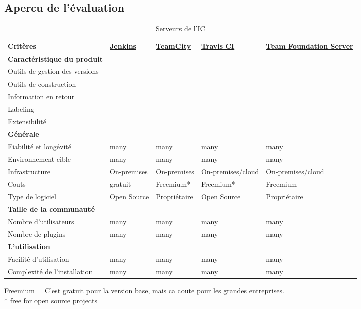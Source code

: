 \begin{landscape}
\subsection{Apercu de l'évaluation}
\begin{table}[H]
	\centering
		\begin{tabular}{lp{4cm}p{4cm}p{4cm}p{4cm}} \toprule
			\textbf{Critères} & \href{https://jenkins-ci.org}{\textbf{Jenkins}} & \href{https://www.jetbrains.com/teamcity/}{\textbf{TeamCity}} & \href{https://travis-ci.org}{\textbf{Travis CI}} & \href{https://www.visualstudio.com/en-us/products/tfs-overview-vs.aspx}{\textbf{Team Foundation Server}} \\ \midrule
			\rowcolor{GrayRow}\textbf{Caractéristique du produit} &  &  &  &  \\ \midrule[0.16em]
			Outils de gestion des versions & & & & \\ \midrule
			Outils de construction & & & & \\ \midrule
			Information en retour & & & & \\ \midrule
			Labeling & & & & \\ \midrule
			Extensibilité & & & & \\ \midrule
			\rowcolor{GrayRow}\textbf{Générale} &  &  &  &  \\ \midrule[0.16em]
			Fiabilité et longévité & many & many & many & many \\ \midrule
			Environnement cible & many & many & many & many \\ \midrule
			Infrastructure & On-premises & On-premises & On-premises/cloud & On-premises/cloud \\ \midrule
			Couts & gratuit & Freemium* & Freemium* & Freemium \\ \midrule
			Type de logiciel & Open Source & Propriétaire & Open Source & Propriétaire \\ \midrule
			\rowcolor{GrayRow}\textbf{Taille de la communauté} & & & & \\ \midrule[0.16em]
			Nombre d'utilisateurs & many & many & many & many \\ \midrule
			Nombre de plugins & many & many & many & many \\ \midrule
			\rowcolor{GrayRow}\textbf{L'utilisation} &  &  &  &  \\ \midrule[0.16em]
			Facilité d'utilisation & many & many & many & many \\ \midrule
			Complexité de l'installation & many & many & many & many \\
			\bottomrule[0.16em]
		\end{tabular}
	\caption{Serveurs de l'IC}
	\label{tab:serveurs_eval}
\end{table}
Freemium = C'est gratuit pour la version base, mais ca coute pour les grandes entreprises.\\
* free for open source projects

\end{landscape}
\newpage

